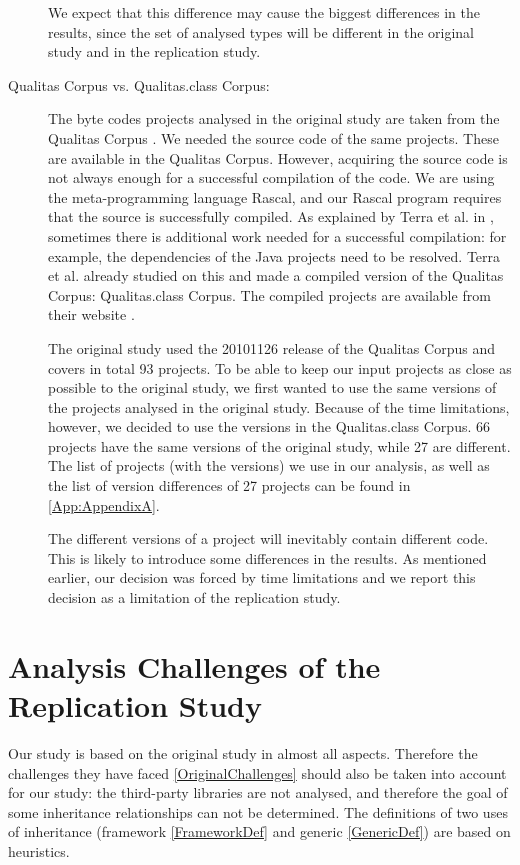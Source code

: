 \documentclass{uvamscse}
\begin{document}
\begin{description}
We expect that this difference may cause the biggest differences in the results, since the set of analysed types will be different in the original study and in the replication study.

\item[Qualitas Corpus vs. Qualitas.class Corpus:] The byte codes projects analysed in the original study are taken from the Qualitas Corpus \cite{QualitasCorpus:APSEC:2010}. We needed the source code of the same projects. These are available in the Qualitas Corpus. However, acquiring the source code is not always enough for a successful compilation of the code. We are using the meta-programming language Rascal, and our Rascal program requires that the source is successfully compiled. As explained by Terra et al. in \cite{qualitas.class}, sometimes there is additional work needed for a successful compilation: for example, the dependencies of the Java projects need to be resolved. Terra et al. already studied on this and made a compiled version of the Qualitas Corpus: Qualitas.class Corpus. The compiled projects are available from their website \cite{qualitas.classCorpusWeb}. 

The original study used the 20101126 release of the Qualitas Corpus and covers in total 93 projects. To be able to keep our input projects as close as possible to the original study, we first wanted to use the same versions of the projects analysed in the original study. Because of the time limitations, however, we decided to use the versions in the Qualitas.class Corpus. 66 projects have the same versions of the original study, while 27 are different. The list of projects (with the versions) we use in our analysis, as well as the list of version differences of 27 projects can be found in \ref{App:AppendixA}.

The different versions of a project will inevitably contain different code. This is likely to introduce some differences in the results. As mentioned earlier, our decision was forced by time limitations and we report this decision as a limitation of the replication study.


\end{description}


\section{Analysis Challenges of the Replication Study} \label{ReplicationChallenges} 
Our study is based on the original study in almost all aspects. Therefore the challenges they have faced \ref{OriginalChallenges} should also be taken into account for our study: the third-party libraries are not analysed, and therefore the goal of some inheritance relationships can not be determined. The definitions of two uses of inheritance (framework \ref{FrameworkDef} and generic \ref{GenericDef}) are based on heuristics.
\end{document}
